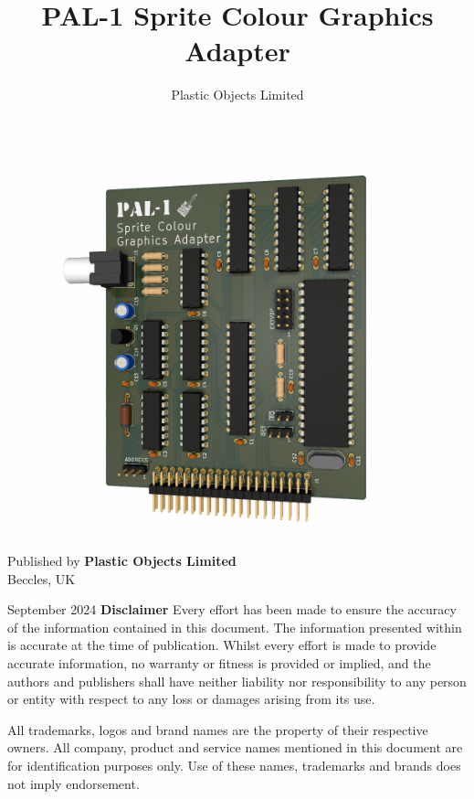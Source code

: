 \documentclass[a4paper,11pt,twoside,openright]{report}
\title{PAL-1 Sprite Colour Graphics Adapter}
\author{Plastic Objects Limited}
\date{}
\newcommand\frontmatter{
  \cleardoublepage
  \pagenumbering{roman}}
\begin{document}
\frontmatter
\begin{titlepage}
\begin{figure}[t]
\centering
\includegraphics[scale=0.4]{images/video.png}
\end{figure}
\maketitle
\end{titlepage}
\clearpage
\noindent Published by \textbf{Plastic Objects Limited} \\
Beccles, UK

\bigskip
\noindent September 2024
\vfill
{\noindent\Large\textbf{Disclaimer}}
\vskip 6pt
Every effort has been made to ensure the accuracy of the information contained in this document. The information presented within is accurate at the time of publication. Whilst every effort is made to provide accurate information, no warranty or fitness is provided or implied, and the authors and publishers shall have neither liability nor responsibility to any person or entity with respect to any loss or damages arising from its use.

All trademarks, logos and brand names are the property of their respective owners. All company, product and service names mentioned in this document are for identification purposes only. Use of these names, trademarks and brands does not imply endorsement.
\end{document}
